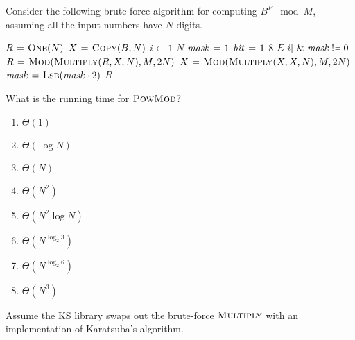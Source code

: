 \documentclass[12pt,twoside]{article}
\newcommand{\isnotequal}{\mathrel{\scalebox{0.8}[1]{!}\hspace*{1pt}\scalebox{0.8}[1]{=}}}
\begin{document}
\begin{problems}
Consider the following brute-force algorithm for computing $B^E \mod M$,
assuming all the input numbers have $N$ digits.

\begin{codebox}
\li $R \mathrel{\hspace{1pt}=\hspace{1pt}} \textnormal{\scshape One}(N)$ 
\li $X \mathrel{\hspace{1pt}=\hspace{1pt}} \textnormal{\scshape Copy}(B, N)$ 
\li \For $i \gets 1$ \To $N$ \label{li:exp-for1}
\li   \Do
        $\id{mask} \gets 1$
\li     \For $\id{bit} \gets 1$ \To $8$ \label{li:exp-for2}
\li       \Do
            \If $E[i] \textrm{ \& } \id{mask} \isnotequal 0$
\li         \Then
              $R \mathrel{\hspace{1pt}=\hspace{1pt}} \textnormal{\scshape Mod}(\textnormal{\scshape Multiply}(R, X, N), M, 2N)$
              \label{li:exp-mulmod1}
            \End
\li         $X \mathrel{\hspace{1pt}=\hspace{1pt}} \textnormal{\scshape Mod}(\textnormal{\scshape Multiply}(X, X, N), M, 2N)$
            \label{li:exp-mulmod2}
\li         $\id{mask} \gets \proc{Lsb}(\id{mask} \cdot 2)$
          \End
      \End
\li \Return $R$
\end{codebox}

\begin{problemparts}

\problempart {} What is the running time for $\textnormal{\scshape PowMod}$?
\begin{enumerate}
  \item $\Theta(1)$
  \item $\Theta(\log N)$
  \item $\Theta(N)$
  \item $\Theta(N^2)$
  \item $\Theta(N^2 \log N)$
  \item $\Theta(N^{\log_2 3})$
  \item $\Theta(N^{\log_2 6})$
  \item $\Theta(N^3)$
\end{enumerate}
\end{problemparts}

Assume the KS library swaps out the brute-force $\textnormal{\scshape Multiply}$ with an
implementation of Karatsuba's algorithm.


\end{problems}
\end{document}
